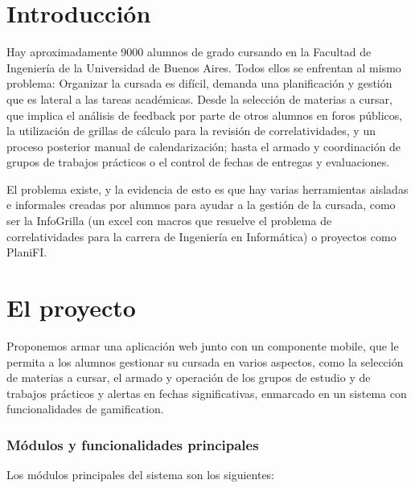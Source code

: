 \documentclass[a4paper,11pt]{article}
\begin{document}

\section*{Introducción}

\baselineskip=18pt
Hay aproximadamente 9000 alumnos de grado cursando en la Facultad de Ingeniería
de la Universidad de Buenos Aires. Todos ellos se enfrentan al mismo problema:
Organizar la cursada es difícil, demanda una planificación y gestión que es
lateral a las tareas académicas. Desde la selección de materias a cursar, que
implica el análisis de feedback por parte de otros alumnos en foros públicos,
la utilización de grillas de cálculo para la revisión de correlatividades, y un
proceso posterior manual de calendarización; hasta el armado y coordinación de
grupos de trabajos prácticos o el control de fechas de entregas y evaluaciones.

El problema existe, y la evidencia de esto es que hay varias herramientas
aisladas e informales creadas por alumnos para ayudar a la gestión de la
cursada, como ser la InfoGrilla (un excel con macros que resuelve el problema
de correlatividades para la carrera de Ingeniería en Informática) o proyectos
como PlaniFI.

\section*{{\Large{}El proyecto}}

Proponemos armar una aplicación web junto con un componente mobile, que le
permita a los alumnos gestionar su cursada en varios aspectos, como la
selección de materias a cursar, el armado y operación de los grupos de estudio
y de trabajos prácticos y alertas en fechas significativas, enmarcado en un
sistema con funcionalidades de gamification.

\subsubsection*{\textbf{Módulos y funcionalidades principales}}

Los módulos principales del sistema son los siguientes:
\end{document}
